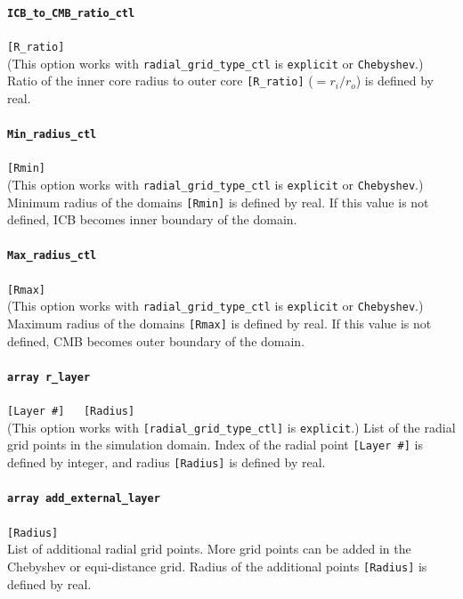 \paragraph{\tt ICB\_to\_CMB\_ratio\_ctl}
\label{href_t:ICB_to_CMB_ratio_ctl} 
\verb|[R_ratio]| \\
(This option works with \verb|radial_grid_type_ctl| is {\tt explicit} or {\tt Chebyshev}.)
Ratio of the inner core radius to outer core \verb|[R_ratio]| ($ = r_{i} / r_{o}$) is defined by real.

\paragraph{\tt Min\_radius\_ctl}
\label{href_t:Min_radius_ctl}
\verb|[Rmin]| \\
(This option works with \verb|radial_grid_type_ctl| is {\tt explicit} or {\tt Chebyshev}.)
Minimum radius of the domains \verb|[Rmin]| is defined by real. If this value is not defined, ICB becomes inner boundary of the domain.

\paragraph{\tt Max\_radius\_ctl }
\label{href_t:Max_radius_ctl} 
\verb|[Rmax]| \\
(This option works with \verb|radial_grid_type_ctl| is {\tt explicit} or {\tt Chebyshev}.)
Maximum radius of the domains \verb|[Rmax]| is defined by real. If this value is not defined, CMB becomes outer boundary of the domain.

\paragraph{\tt array r\_layer}
\label{href_t:r_layer}
\verb|[Layer #]   [Radius]| \\
(This option works with \verb|[radial_grid_type_ctl]| is {\tt explicit}.)
List of the radial grid points in the simulation domain. Index of the radial point \verb|[Layer #]| is defined by integer, and radius \verb|[Radius]| is defined by real.

\paragraph{\tt array add\_external\_layer}
\label{href_t:add_external_layer}
\verb|[Radius]| \\
List of additional radial grid points. More grid points can be added in the Chebyshev or equi-distance grid. Radius of the additional points \verb|[Radius]| is defined by real.

